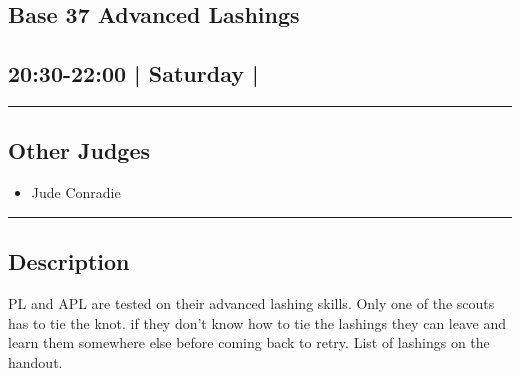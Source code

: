 \documentclass[10pt, A5]{article}
\begin{document}
		\begin{framed}
			\begin{minipage}{\textwidth}

			\setcounter{section}{79}
							\section{\faStar \: Base 37 \faStar \: Advanced Lashings}
						
			\subsection*{20:30-22:00 | Saturday | }

			\vspace{0.25cm}
			\hrule
			\vspace{0.25cm}


			\subsection*{Other Judges}
							

				\begin{multicols}{2}

			\begin{itemize}
											\item Jude Conradie
								\end{itemize}

			\vfill\null
			\columnbreak

			\begin{itemize}
								\end{itemize}

			\vfill\null

			\end{multicols}

			\vspace{0.25cm}
			\hrule
			\vspace{0.25cm}

			\begin{minipage}{\textwidth}
			\subsection*{\faListAlt \: Description}
			PL and APL are tested on their advanced lashing skills. Only one of the scouts has to tie the knot. if they don't know how to tie the lashings they can leave and learn them somewhere else before coming back to retry. List of lashings on the handout.
			\end{minipage}


	\end{minipage}
	\end{framed}
\end{document}
